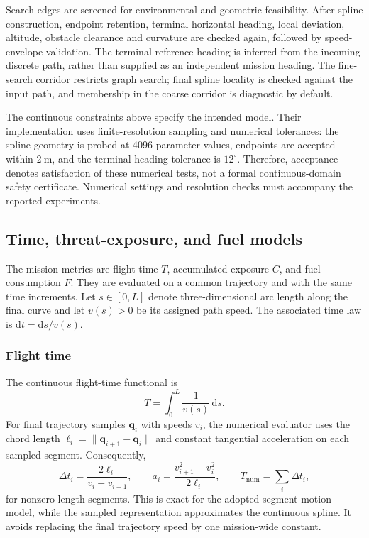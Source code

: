 Search edges are screened for environmental and geometric feasibility.
After spline construction, endpoint retention, terminal horizontal heading,
local deviation, altitude, obstacle clearance and curvature are checked
again, followed by speed-envelope validation. The terminal reference heading
is inferred from the incoming discrete path, rather than supplied as an
independent mission heading. The fine-search corridor restricts graph search;
final spline locality is checked against the input path, and membership in
the coarse corridor is diagnostic by default.

The continuous constraints above specify the intended model. Their
implementation uses finite-resolution sampling and numerical tolerances:
the spline geometry is probed at 4096 parameter values, endpoints are accepted
within $2~\mathrm{m}$, and the terminal-heading tolerance is $12^\circ$.
Therefore, acceptance denotes satisfaction of these numerical tests, not
a formal continuous-domain safety certificate. Numerical settings and
resolution checks must accompany the reported experiments.

\subsection{Time, threat-exposure, and fuel models}
\label{pr:sec:metrics}
The mission metrics are flight time $T$, accumulated exposure $C$, and
fuel consumption $F$. They are evaluated on a common trajectory and with
the same time increments. Let $s\in[0,L]$ denote three-dimensional arc
length along the final curve and let $v(s)>0$ be its assigned path speed.
The associated time law is $\mathrm{d}t=\mathrm{d}s/v(s)$.

\subsubsection{Flight time}
The continuous flight-time functional is
\begin{equation}
 T=\int_0^L\frac{1}{v(s)}\,\mathrm{d}s.
 \label{pr:eq:time}
\end{equation}
For final trajectory samples $\mathbf{q}_i$ with speeds $v_i$, the numerical
evaluator uses the chord length
$\ell_i=\|\mathbf{q}_{i+1}-\mathbf{q}_i\|$ and constant tangential
acceleration on each sampled segment. Consequently,
\begin{equation}
 \Delta t_i=\frac{2\ell_i}{v_i+v_{i+1}},\qquad
 a_i=\frac{v_{i+1}^2-v_i^2}{2\ell_i},\qquad
 T_{\mathrm{num}}=\sum_i\Delta t_i,
 \label{pr:eq:segmenttime}
\end{equation}
for nonzero-length segments. This is exact for the adopted segment motion
model, while the sampled representation approximates the continuous spline.
It avoids replacing the final trajectory speed by one mission-wide constant.


